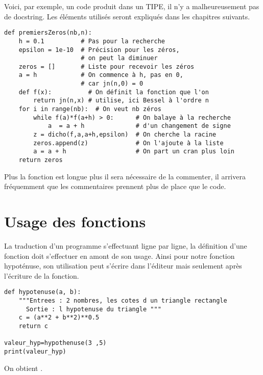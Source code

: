 Voici, par exemple, un code produit dans un TIPE, il n'y a malheureusement pas de docstring. Les éléments utilisés seront expliqués dans les chapitres suivants.
\begin{lstlisting}
def premiersZeros(nb,n):
    h = 0.1          # Pas pour la recherche
    epsilon = 1e-10  # Précision pour les zéros,
                     # on peut la diminuer
    zeros = []       # Liste pour recevoir les zéros
    a = h            # On commence à h, pas en 0, 
                     # car jn(n,0) = 0
    def f(x):          # On définit la fonction que l'on 
        return jn(n,x) # utilise, ici Bessel à l'ordre n
    for i in range(nb):  # On veut nb zéros
        while f(a)*f(a+h) > 0:      # On balaye à la recherche 
            a  = a + h              # d'un changement de signe
        z = dicho(f,a,a+h,epsilon)  # On cherche la racine 
        zeros.append(z)             # On l'ajoute à la liste
        a = a + h                   # On part un cran plus loin
    return zeros
\end{lstlisting}
Plus la fonction est longue plus il sera nécessaire de la commenter, il arrivera fréquemment que les commentaires prennent plus de place que le code.
\newpage
\section{Usage des fonctions}
La traduction d'un programme s'effectuant ligne par ligne, la définition d'une fonction doit s'effectuer en amont de son usage.
Ainsi pour notre fonction hypoténuse, son utilisation peut s'écrire dans l'éditeur mais seulement après l'écriture de la fonction.

\begin{lstlisting}
def hypotenuse(a, b):
    """Entrees : 2 nombres, les cotes d un triangle rectangle
      Sortie : l hypotenuse du triangle """
	c = (a**2 + b**2)**0.5
	return c

valeur_hyp=hypothenuse(3 ,5)
print(valeur_hyp)
\end{lstlisting}
On obtient .

